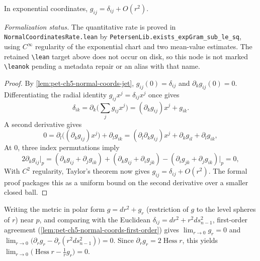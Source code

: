 \begin{lemma}
  \label{lem:pet-ch5-normal-coords-first-order}
  In exponential coordinates, $g_{ij}=\delta_{ij}+O(r^2)$.

  \emph{Formalization status.} The quantitative rate is proved in
  \texttt{NormalCoordinatesRate.lean} by
  \texttt{PetersenLib.exists\_expGram\_sub\_le\_sq}, using $C^\infty$ regularity
  of the exponential chart and two mean-value estimates. The retained
  \texttt{\textbackslash lean} target above does not occur on disk, so this node
  is not marked \texttt{\textbackslash leanok} pending a metadata repair or an
  alias with that name.
\end{lemma}
\begin{proof}
  \sketch
  By \cref{lem:pet-ch5-normal-coords-jet}, $g_{ij}(0)=\delta_{ij}$ and
  $\partial_kg_{ij}(0)=0$.  Differentiating the radial identity
  $g_{ij}x^j=\delta_{ij}x^j$ once gives
  \[
    \delta_{ik}=\partial_k\Big(\sum_jg_{ij}x^j\Big)=(\partial_kg_{ij})x^j+g_{ik}.
  \]
  A second derivative gives
  \[
    0=\partial_l\big((\partial_kg_{ij})x^j\big)+\partial_lg_{ik}
    =(\partial_l\partial_kg_{ij})x^j+\partial_kg_{il}+\partial_lg_{ik},
  \]
  At $0$, three index permutations imply
  \[
    2\partial_kg_{ij}|_p=(\partial_kg_{ij}+\partial_jg_{ik})+(\partial_kg_{ij}+\partial_ig_{jk})
    -(\partial_ig_{jk}+\partial_jg_{ik})\Big|_p=0,
  \]
  With $C^2$ regularity, Taylor's theorem now gives
  $g_{ij}=\delta_{ij}+O(r^2)$. The formal proof packages this as a uniform bound
  on the second derivative over a smaller closed ball.
\end{proof}

\begin{remark}
  \label{rem:pet-ch5-hessian-r-asymptotics}
  Writing the metric in polar form $g=dr^2+g_r$ (restriction of $g$ to the level
  spheres of $r$) near $p$, and comparing with the Euclidean
  $\delta_{ij}=dr^2+r^2ds_{n-1}^2$, first-order agreement
  (\cref{lem:pet-ch5-normal-coords-first-order}) gives $\lim_{r\to0}g_r=0$ and
  $\lim_{r\to0}\big(\partial_rg_r-\partial_r(r^2ds_{n-1}^2)\big)=0$. Since
  $\partial_rg_r=2\operatorname{Hess}r$, this yields
  $\lim_{r\to0}\big(\operatorname{Hess}r-\tfrac1rg_r\big)=0$.
\end{remark}

